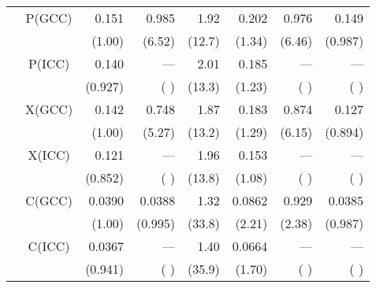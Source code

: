 \documentclass[a4j]{jarticle}
\begin{document}
\begin{table*}[!t]
\begin{center}
\begin{tabular}{|c|c|r|r|r|r|r|r|}
           & P(GCC) & 0.151  & 0.985  & 1.92   & 0.202  & 0.976  & 0.149 \\ 
           &        & (1.00) & (6.52) & (12.7) & (1.34) & (6.46) &(0.987)\\ \cline{2-8}
           & P(ICC) & 0.140  & ---    & 2.01   & 0.185  & ---    & ---   \\ 
           &        & (0.927)& (    ) & (13.3) & (1.23) & (    ) & (    )\\ \cline{2-8}
           & X(GCC) & 0.142  & 0.748  & 1.87   & 0.183  & 0.874  & 0.127 \\ 
           &        & (1.00) & (5.27) & (13.2) & (1.29) & (6.15) &(0.894)\\ \cline{2-8}
           & X(ICC) & 0.121  & ---    & 1.96   & 0.153  & ---    & ---   \\ 
           &        & (0.852)& (    ) & (13.8) & (1.08) & (    ) & (    )\\ \cline{2-8}
           & C(GCC) & 0.0390 & 0.0388 & 1.32   & 0.0862 & 0.929  & 0.0385\\ 
           &        & (1.00) & (0.995)& (33.8) & (2.21) & (2.38) &(0.987)\\ \cline{2-8}
           & C(ICC) & 0.0367 & ---    & 1.40   & 0.0664 & ---    & ---   \\ 
           &        & (0.941)& (    ) & (35.9) & (1.70) & (    ) & (    )\\ \hline
\end{tabular}
\normalsize
\end{center}
\end{table*}
\end{document}
